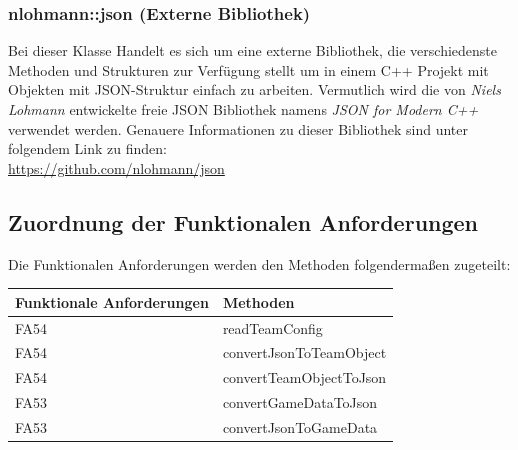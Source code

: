     \subsubsection{nlohmann::json (Externe Bibliothek)}
		Bei dieser Klasse Handelt es sich um eine externe Bibliothek, die verschiedenste Methoden und Strukturen zur Verfügung stellt um in einem C++ Projekt mit Objekten mit JSON-Struktur einfach zu arbeiten. Vermutlich wird die von \textit{Niels Lohmann} entwickelte freie JSON Bibliothek namens \textit{JSON for Modern C++} verwendet werden. Genauere Informationen zu dieser Bibliothek sind unter folgendem Link zu finden: \\ \url{https://github.com/nlohmann/json}

\subsection{Zuordnung der Funktionalen Anforderungen}

Die Funktionalen Anforderungen werden den Methoden folgendermaßen zugeteilt:


\begin{table}[h]
	\centering
	\begin{tabular}{|l|l|}
    	\hline
    	\textbf{Funktionale Anforderungen} & \textbf{Methoden} \\ \hline
    	FA54 & readTeamConfig \\ \hline
    	FA54 & convertJsonToTeamObject \\ \hline
    	FA54 & convertTeamObjectToJson \\ \hline
    	FA53 & convertGameDataToJson \\ \hline
    	FA53 & convertJsonToGameData \\ \hline

	\end{tabular}
\end{table}